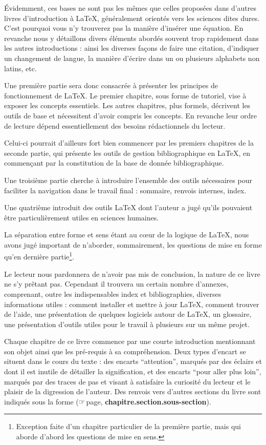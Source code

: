 Évidemment, ces bases ne sont pas les mêmes que celles proposées dans d'autres livres d'introduction à \LaTeX{}, généralement orientés vers les sciences dites dures. 
C'est pourquoi vous n'y trouverez pas la manière d'insérer une équation. En revanche nous y détaillons divers éléments abordés souvent trop rapidement dans les autres introductions : ainsi les diverses façons de faire une citation, d'indiquer un changement de langue, la manière d'écrire dans un ou plusieurs alphabets non latins, etc.

Une première partie sera donc consacrée à présenter les principes de fonctionnement de \LaTeX. Le premier chapitre, sous forme de tutoriel, vise à exposer les concepts essentiels. Les autres chapitres, plus formels, décrivent les outils de base et nécessitent d'avoir compris les concepts. En revanche leur ordre de lecture dépend essentiellement des besoins rédactionnels du lecteur. 

Celui-ci pourrait d'ailleurs fort bien commencer par les premiers chapitres de la seconde partie, qui présente les outils de gestion bibliographique en \LaTeX{}, en commençant par la constitution de la base de donnée bibliographique.

Une troisième partie cherche à introduire l'ensemble des outils nécessaires pour faciliter la navigation dans le travail final : sommaire, renvois internes, index.

Une quatrième introduit des outils \LaTeX{} dont l'auteur a jugé qu'ils pouvaient être particulièrement utiles en sciences humaines.

La séparation entre forme et sens étant au cœur de la logique de \LaTeX{}, nous avons jugé important  de n'aborder, sommairement,  les questions de mise en forme qu'en dernière partie\footnote{Exception faite d'un chapitre particulier de la première partie, mais qui aborde d'abord les questions de mise en sens.}.

Le lecteur nous pardonnera de n'avoir pas mis de conclusion, la nature de ce livre ne s'y prêtant pas. Cependant il trouvera un certain nombre d'annexes, comprenant, outre les indispensables index et bibliographies, diverses informations utiles : comment installer et mettre à jour  \LaTeX{}, comment trouver de l'aide, une présentation de quelques logiciels autour de \LaTeX{}, un glossaire, une présentation d'outils utiles pour le travail à plusieurs sur un même projet.

Chaque chapitre de ce livre commence par une courte introduction mentionnant son objet ainsi que les pré-requis à sa compréhension. Deux types d'encart se situent dans le cours du texte : des encarts \enquote{attention}, marqués par des éclairs et dont il est inutile de détailler la signification, et des encarts \enquote{pour aller plus loin}, marqués par des traces de pas et visant à satisfaire la curiosité du lecteur et le plaisir de la digression de l'auteur. Des renvois vers d'autres sections du livre sont indiqués sous la forme (☞\,page, \textbf{chapitre.section.sous-section}).

